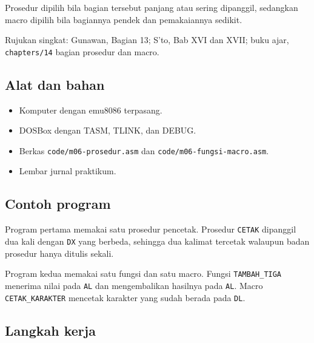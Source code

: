 Prosedur dipilih bila bagian tersebut panjang atau sering dipanggil,
sedangkan macro dipilih bila bagiannya pendek dan pemakaiannya
sedikit.

\begin{rujukan}
Rujukan singkat: Gunawan, Bagian 13; S'to, Bab XVI dan XVII; buku
ajar, \texttt{chapters/14} bagian prosedur dan macro.
\end{rujukan}

\subsection{Alat dan bahan}

\begin{itemize}
    \item Komputer dengan emu8086 terpasang.
    \item DOSBox dengan TASM, TLINK, dan DEBUG.
    \item Berkas \texttt{code/m06-prosedur.asm} dan
          \texttt{code/m06-fungsi-macro.asm}.
    \item Lembar jurnal praktikum.
\end{itemize}

\subsection{Contoh program}

Program pertama memakai satu prosedur pencetak. Prosedur
\texttt{CETAK} dipanggil dua kali dengan \texttt{DX} yang berbeda,
sehingga dua kalimat tercetak walaupun badan prosedur hanya ditulis
sekali.



Program kedua memakai satu fungsi dan satu macro. Fungsi
\texttt{TAMBAH\_TIGA} menerima nilai pada \texttt{AL} dan
mengembalikan hasilnya pada \texttt{AL}. Macro
\texttt{CETAK\_KARAKTER} mencetak karakter yang sudah berada pada
\texttt{DL}.



\subsection{Langkah kerja}

